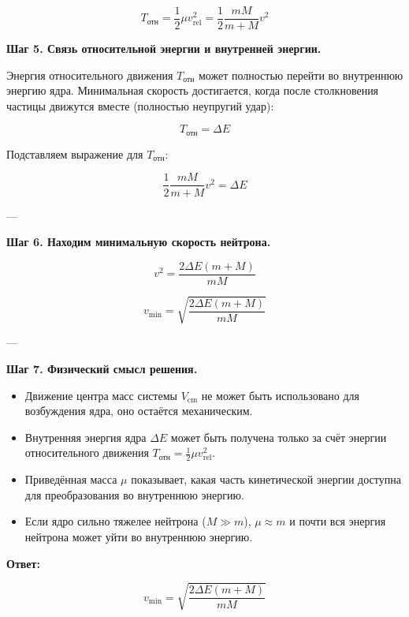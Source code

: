 \documentclass[a4paper,12pt]{article}
\begin{document}
\[
T_\text{отн} = \frac{1}{2} \mu v_\text{rel}^2 = \frac{1}{2} \frac{m M}{m+M} v^2
\]

\medskip
\textbf{Шаг 5. Связь относительной энергии и внутренней энергии.}

Энергия относительного движения $T_\text{отн}$ может полностью перейти во внутреннюю энергию ядра. Минимальная скорость достигается, когда после столкновения частицы движутся вместе (полностью неупругий удар):

\[
T_\text{отн} = \Delta E
\]

Подставляем выражение для $T_\text{отн}$:

\[
\frac{1}{2} \frac{m M}{m+M} v^2 = \Delta E
\]

---

\textbf{Шаг 6. Находим минимальную скорость нейтрона.}

\[
v^2 = \frac{2 \Delta E (m+M)}{m M} 
\]

\[
\boxed{v_\text{min} = \sqrt{\frac{2 \Delta E (m+M)}{m M}}}
\]

---

\textbf{Шаг 7. Физический смысл решения.}

\begin{itemize}
    \item Движение центра масс системы $V_\text{cm}$ не может быть использовано для возбуждения ядра, оно остаётся механическим. 
    \item Внутренняя энергия ядра $\Delta E$ может быть получена только за счёт энергии относительного движения $T_\text{отн} = \frac{1}{2} \mu v_\text{rel}^2$. 
    \item Приведённая масса $\mu$ показывает, какая часть кинетической энергии доступна для преобразования во внутреннюю энергию.
    \item Если ядро сильно тяжелее нейтрона ($M \gg m$), $\mu \approx m$ и почти вся энергия нейтрона может уйти во внутреннюю энергию.
\end{itemize}

\bigskip
\textbf{Ответ:}

\[
\displaystyle v_\text{min} = \sqrt{\frac{2 \Delta E (m+M)}{m M}}
\]
\end{document}
